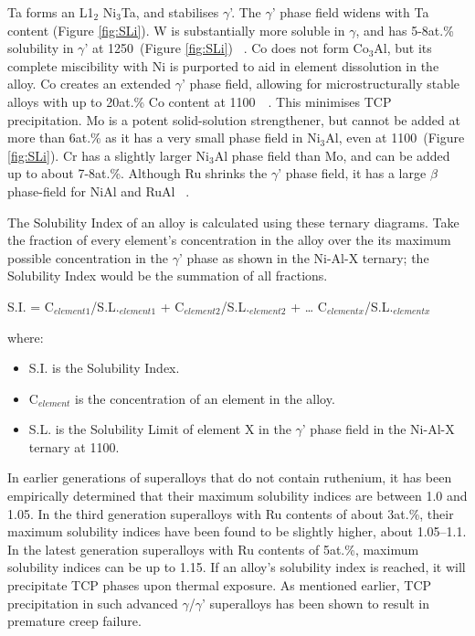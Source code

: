 Ta forms an L1$_2$ Ni$_3$Ta, and stabilises $\gamma$'.  The $\gamma$' phase field widens with Ta content (Figure \ref{fig:SLi}).  W is substantially more soluble in $\gamma$, and has 5-8at.\% solubility in $\gamma$' at 1250\celsius\ (Figure \ref{fig:SLi}) ~\cite{hong89, udovskii91}.  Co does not form Co$_3$Al, but its complete miscibility with Ni is purported to aid in element dissolution in the alloy.  Co creates an extended $\gamma$' phase field, allowing for microstructurally stable alloys with up to 20at.\% Co content at 1100\celsius\ ~\cite{kainuma96}.  This minimises TCP precipitation.   Mo is a potent solid-solution strengthener, but cannot be added at more than 6at.\% as it has a very small phase field in Ni$_3$Al, even at 1100\celsius\ (Figure \ref{fig:SLi}).  Cr has a slightly larger Ni$_3$Al phase field than Mo, and can be added up to about 7-8at.\%. Although Ru shrinks the $\gamma$' phase field, it has a large $\beta$ phase-field for NiAl and RuAl ~\cite{trety93}.

The Solubility Index of an alloy is calculated using these ternary diagrams.  Take the fraction of every element’s concentration in the alloy over the its maximum possible concentration in the $\gamma$' phase as shown in the Ni-Al-X ternary; the Solubility Index would be the summation of all fractions.

	S.I. = C$_{element 1}$/S.L.$_{element 1}$ + C$_{element 2}$/S.L.$_{element 2}$ + … C$_{element x}$/S.L.$_{element x}$


where: 
\begin{itemize}
\item[] S.I. is the Solubility Index.
\item[] C$_{element}$ is the concentration of an element in the alloy. 
\item[] S.L. is the Solubility Limit of element X in the $\gamma$' phase field in the Ni-Al-X ternary at 1100\celsius.  
\end{itemize}  

In earlier generations of superalloys that do not contain ruthenium, it has been empirically determined that their maximum solubility indices are between 1.0 and 1.05.  In the third generation superalloys with Ru contents of about 3at.\%, their maximum solubility indices have been found to be slightly higher, about 1.05--1.1.  In the latest generation superalloys with Ru contents of 5at.\%, maximum solubility indices can be up to 1.15.  If an alloy’s solubility index is reached, it will precipitate TCP phases upon thermal exposure.  As mentioned earlier, TCP precipitation in such advanced $\gamma$/$\gamma$' superalloys has been shown to result in premature creep failure.



